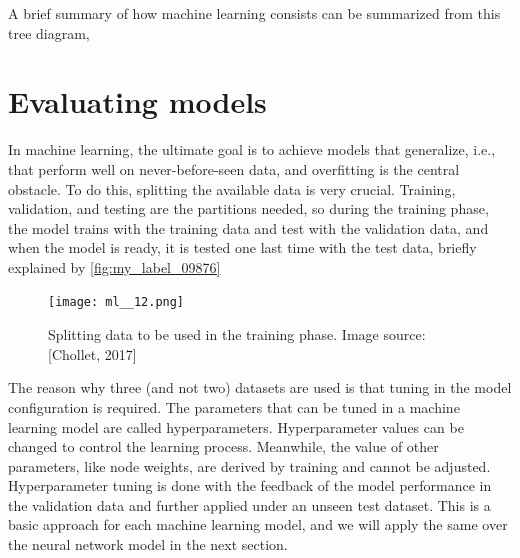 A brief summary of how machine learning consists can be summarized from this tree diagram,
%

\section{Evaluating models}
In machine learning, the ultimate goal is to achieve models that generalize, i.e., that perform well on never-before-seen data, and overfitting is the central obstacle. To do this, splitting the available data is very crucial. Training, validation, and testing are the partitions  
needed, so during the training phase, the model trains with the training data and test with the validation data, and when the model is ready, it is tested one last time with the test data, briefly explained by \autoref{fig:my_label_09876} \\
\begin{figure}[H]
    \centering
    \texttt{[image: ml\_\_12.png]}
    \caption{Splitting data to be used in the training phase. Image source: [Chollet, 2017]}
    \label{fig:my_label_09876}
\end{figure}
The reason why three (and not two) datasets are used is that tuning in the model configuration is required. The parameters that can be tuned in a machine learning model are called hyperparameters. Hyperparameter values can be changed to control the learning process. Meanwhile, the value of other parameters, like node weights, are derived by training and cannot be adjusted. Hyperparameter tuning is done with the feedback of the model performance in the validation data and further applied under an unseen test dataset. This is a basic approach for each machine learning model, and we will apply the same over the neural network model in the next section.

